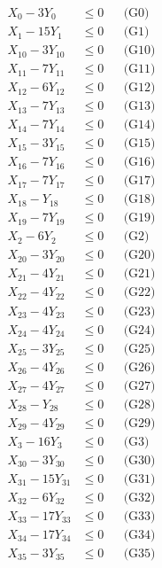 \documentclass[a4paper,10pt]{article}
\begin{document}
\allowdisplaybreaks
{\small\begin{align}
X_{0} - 3Y_{0} &\leq 0 && \text{(G0)} \\
X_{1} - 15Y_{1} &\leq 0 && \text{(G1)} \\
X_{10} - 3Y_{10} &\leq 0 && \text{(G10)} \\
X_{11} - 7Y_{11} &\leq 0 && \text{(G11)} \\
X_{12} - 6Y_{12} &\leq 0 && \text{(G12)} \\
X_{13} - 7Y_{13} &\leq 0 && \text{(G13)} \\
X_{14} - 7Y_{14} &\leq 0 && \text{(G14)} \\
X_{15} - 3Y_{15} &\leq 0 && \text{(G15)} \\
X_{16} - 7Y_{16} &\leq 0 && \text{(G16)} \\
X_{17} - 7Y_{17} &\leq 0 && \text{(G17)} \\
X_{18} - Y_{18} &\leq 0 && \text{(G18)} \\
X_{19} - 7Y_{19} &\leq 0 && \text{(G19)} \\
X_{2} - 6Y_{2} &\leq 0 && \text{(G2)} \\
X_{20} - 3Y_{20} &\leq 0 && \text{(G20)} \\
X_{21} - 4Y_{21} &\leq 0 && \text{(G21)} \\
X_{22} - 4Y_{22} &\leq 0 && \text{(G22)} \\
X_{23} - 4Y_{23} &\leq 0 && \text{(G23)} \\
X_{24} - 4Y_{24} &\leq 0 && \text{(G24)} \\
X_{25} - 3Y_{25} &\leq 0 && \text{(G25)} \\
X_{26} - 4Y_{26} &\leq 0 && \text{(G26)} \\
\allowbreak
X_{27} - 4Y_{27} &\leq 0 && \text{(G27)} \\
X_{28} - Y_{28} &\leq 0 && \text{(G28)} \\
X_{29} - 4Y_{29} &\leq 0 && \text{(G29)} \\
X_{3} - 16Y_{3} &\leq 0 && \text{(G3)} \\
X_{30} - 3Y_{30} &\leq 0 && \text{(G30)} \\
X_{31} - 15Y_{31} &\leq 0 && \text{(G31)} \\
X_{32} - 6Y_{32} &\leq 0 && \text{(G32)} \\
X_{33} - 17Y_{33} &\leq 0 && \text{(G33)} \\
X_{34} - 17Y_{34} &\leq 0 && \text{(G34)} \\
X_{35} - 3Y_{35} &\leq 0 && \text{(G35)} \\

\end{align}}
\end{document}
